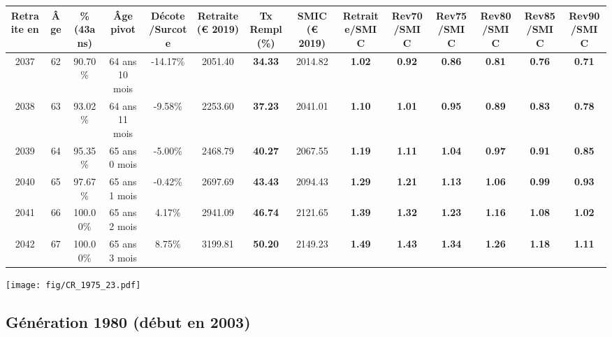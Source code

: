 \begin{adjustbox}{max width=\textwidth} 
\begin{tabular}[htb]{|c|c||c|c|c||c|c||c||c|c|c|c|c|c|} 
\hline 
 Retraite en &  Âge &  \%(43ans) &  Âge pivot &  Décote/Surcote &  Retraite (\euro{} 2019) &  Tx Rempl(\%) &  SMIC (\euro{} 2019) &  Retraite/SMIC &  Rev70/SMIC &  Rev75/SMIC &  Rev80/SMIC &  Rev85/SMIC &  Rev90/SMIC \\ 
\hline \hline 
 2037 &  62 &  90.70\% &  64 ans 10 mois &  -14.17\% &  2051.40 &  {\bf 34.33} &  2014.82 &  {\bf 1.02} &  {\bf {\color{red} 0.92}} &  {\bf {\color{red} 0.86}} &  {\bf {\color{red} 0.81}} &  {\bf {\color{red} 0.76}} &  {\bf {\color{red} 0.71}} \\ 
\hline 
 2038 &  63 &  93.02\% &  64 ans 11 mois &  -9.58\% &  2253.60 &  {\bf 37.23} &  2041.01 &  {\bf 1.10} &  {\bf 1.01} &  {\bf {\color{red} 0.95}} &  {\bf {\color{red} 0.89}} &  {\bf {\color{red} 0.83}} &  {\bf {\color{red} 0.78}} \\ 
\hline 
 2039 &  64 &  95.35\% &  65 ans 0 mois &  -5.00\% &  2468.79 &  {\bf 40.27} &  2067.55 &  {\bf 1.19} &  {\bf 1.11} &  {\bf 1.04} &  {\bf {\color{red} 0.97}} &  {\bf {\color{red} 0.91}} &  {\bf {\color{red} 0.85}} \\ 
\hline 
 2040 &  65 &  97.67\% &  65 ans 1 mois &  -0.42\% &  2697.69 &  {\bf 43.43} &  2094.43 &  {\bf 1.29} &  {\bf 1.21} &  {\bf 1.13} &  {\bf 1.06} &  {\bf {\color{red} 0.99}} &  {\bf {\color{red} 0.93}} \\ 
\hline 
 2041 &  66 &  100.00\% &  65 ans 2 mois &  4.17\% &  2941.09 &  {\bf 46.74} &  2121.65 &  {\bf 1.39} &  {\bf 1.32} &  {\bf 1.23} &  {\bf 1.16} &  {\bf 1.08} &  {\bf 1.02} \\ 
\hline 
 2042 &  67 &  100.00\% &  65 ans 3 mois &  8.75\% &  3199.81 &  {\bf 50.20} &  2149.23 &  {\bf 1.49} &  {\bf 1.43} &  {\bf 1.34} &  {\bf 1.26} &  {\bf 1.18} &  {\bf 1.11} \\ 
\hline 
\hline 
\end{tabular} 
\end{adjustbox} 
 
 \vspace{0.1cm} 

 \begin{center}\texttt{[image: fig/CR\_1975\_23.pdf]}\end{center} \label{fig/CR_1975_23.pdf} 

\newpage 
 
\subsection{Génération 1980 (début en 2003)} 

